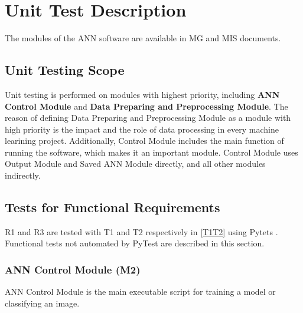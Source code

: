 \documentclass[12pt, titlepage]{article}
\begin{document}
\section{Unit Test Description}\label{UnitTest}

The modules of the ANN software are available in MG \citep{MG} and 
MIS \citep{MIS} documents.

\subsection{Unit Testing Scope}

Unit testing is performed on modules with highest priority, including \textbf{ANN Control Module} 
and \textbf{Data Preparing and Preprocessing Module}. The reason of defining 
Data Preparing and Preprocessing Module as a module with high priority 
is the impact and the role of data processing in every machine learining project. 
Additionally, Control Module includes the main function of running the software, 
which makes it an important module. Control Module uses Output Module and Saved ANN Module 
directly, and all other modules indirectly. 

\subsection{Tests for Functional Requirements}

R1 and R3 are tested with T1 and T2 respectively in \ref{T1T2} using Pytets \citep{pytest}. 
Functional tests not automated by PyTest \citep{pytest} are described in this section.


\subsubsection{ ANN Control Module (M2)}

ANN Control Module is the main executable script for training a model or classifying an image.
\end{document}
